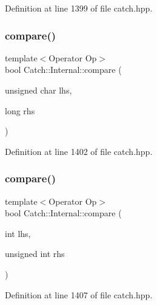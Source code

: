 Definition at line 1399 of file catch.\+hpp.

\hypertarget{namespace_catch_1_1_internal_a640e0cce9260a912842bee58db501dc5}{}\label{namespace_catch_1_1_internal_a640e0cce9260a912842bee58db501dc5} 
\subsubsection{\texorpdfstring{compare()}{compare()}\hspace{0.1cm}{\footnotesize\ttfamily [7/17]}}
{\footnotesize\ttfamily template$<$Operator Op$>$ \\
bool Catch\+::\+Internal\+::compare (\begin{DoxyParamCaption}\item[{unsigned char}]{lhs,  }\item[{long}]{rhs }\end{DoxyParamCaption})}



Definition at line 1402 of file catch.\+hpp.

\hypertarget{namespace_catch_1_1_internal_a17c92ed4b6d88a9f8bbcbc52544fe40f}{}\label{namespace_catch_1_1_internal_a17c92ed4b6d88a9f8bbcbc52544fe40f} 
\subsubsection{\texorpdfstring{compare()}{compare()}\hspace{0.1cm}{\footnotesize\ttfamily [8/17]}}
{\footnotesize\ttfamily template$<$Operator Op$>$ \\
bool Catch\+::\+Internal\+::compare (\begin{DoxyParamCaption}\item[{int}]{lhs,  }\item[{unsigned int}]{rhs }\end{DoxyParamCaption})}



Definition at line 1407 of file catch.\+hpp.

\hypertarget{namespace_catch_1_1_internal_aac7a6452ed0d324031ceb7b4f3a3b61c}{}\label{namespace_catch_1_1_internal_aac7a6452ed0d324031ceb7b4f3a3b61c} 
